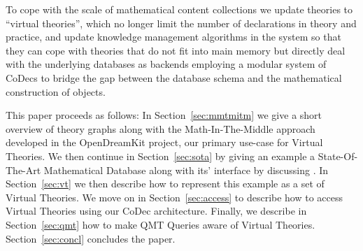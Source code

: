 To cope with the scale of mathematical content collections we update \ommt theories to ``virtual theories'', which no longer limit the number of declarations in theory and practice, and update knowledge management algorithms in the \mmt system so that they can cope with theories that do not fit into main memory but directly deal with the underlying databases as backends employing a modular system of CoDecs to bridge the gap between the database schema and the mathematical construction of objects.

This paper proceeds as follows: 
In Section~\ref{sec:mmtmitm} we give a short overview of \ommt theory graphs along with the Math-In-The-Middle approach developed in the OpenDreamKit project, our primary use-case for Virtual Theories. 
We then continue in Section~\ref{sec:sota} by giving an example a State-Of-The-Art Mathematical Database along with its' interface by discussing \lmfdb. 
In Section~\ref{sec:vt} we then describe how to represent this example as a set of Virtual Theories. 
We move on in Section~\ref{sec:access} to describe how to access Virtual Theories using our CoDec architecture. 
Finally, we describe in Section~\ref{sec:qmt} how to make QMT Queries aware of Virtual Theories. 
Section~\ref{sec:concl} concludes the paper.


